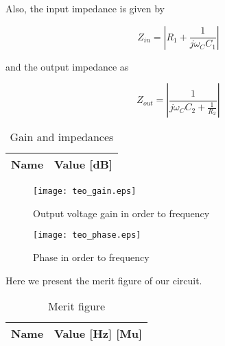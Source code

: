 Also, the input impedance is given by

\begin{equation} \label{eq6}
Z_{in}=|R_1 + \frac{1}{j \omega_C C_1}|
\end{equation}

and the output impedance as

\begin{equation} \label{eq7}
Z_{out}=|\frac{1}{j \omega_C C_2+\frac{1}{R_2}}|
\end{equation}

\begin{table}[h]
  \centering
  \begin{tabular}{|l|r|}
    \hline    
    {\bf Name} & {\bf Value [dB]} \\ \hline
    
  \end{tabular}
  \caption{Gain and impedances}
  \label{tab:data2}
\end{table}
\FloatBarrier

\begin{figure}[h] \centering
\texttt{[image: teo\_gain.eps]}
\caption{Output voltage gain in order to frequency}
\label{fig:gain}
\end{figure}
\FloatBarrier

\begin{figure}[h] \centering
\texttt{[image: teo\_phase.eps]}
\caption{Phase in order to frequency}
\label{fig:phase}
\end{figure}
\FloatBarrier

Here we present the merit figure of our circuit.

\begin{table}[h]
  \centering
  \begin{tabular}{|l|r|}
    \hline    
    {\bf Name} & {\bf Value [Hz] [Mu]} \\ \hline
    
  \end{tabular}
  \caption{Merit figure}
  \label{tab:data3}
\end{table}
\FloatBarrier



